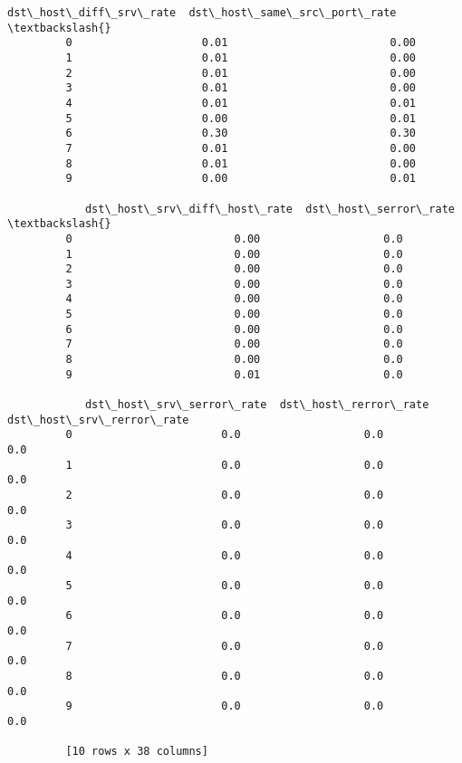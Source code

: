 \documentclass[11pt]{article}
\begin{document}
\begin{Verbatim}[commandchars=\\\{\}]
            dst\_host\_diff\_srv\_rate  dst\_host\_same\_src\_port\_rate  \textbackslash{}
         0                    0.01                         0.00   
         1                    0.01                         0.00   
         2                    0.01                         0.00   
         3                    0.01                         0.00   
         4                    0.01                         0.01   
         5                    0.00                         0.01   
         6                    0.30                         0.30   
         7                    0.01                         0.00   
         8                    0.01                         0.00   
         9                    0.00                         0.01   
         
            dst\_host\_srv\_diff\_host\_rate  dst\_host\_serror\_rate  \textbackslash{}
         0                         0.00                   0.0   
         1                         0.00                   0.0   
         2                         0.00                   0.0   
         3                         0.00                   0.0   
         4                         0.00                   0.0   
         5                         0.00                   0.0   
         6                         0.00                   0.0   
         7                         0.00                   0.0   
         8                         0.00                   0.0   
         9                         0.01                   0.0   
         
            dst\_host\_srv\_serror\_rate  dst\_host\_rerror\_rate  dst\_host\_srv\_rerror\_rate  
         0                       0.0                   0.0                       0.0  
         1                       0.0                   0.0                       0.0  
         2                       0.0                   0.0                       0.0  
         3                       0.0                   0.0                       0.0  
         4                       0.0                   0.0                       0.0  
         5                       0.0                   0.0                       0.0  
         6                       0.0                   0.0                       0.0  
         7                       0.0                   0.0                       0.0  
         8                       0.0                   0.0                       0.0  
         9                       0.0                   0.0                       0.0  
         
         [10 rows x 38 columns]
\end{Verbatim}
            
\end{document}
